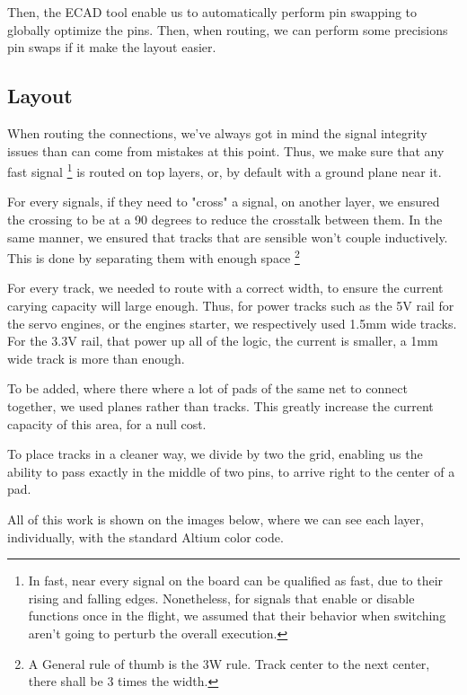 Then, the ECAD tool enable us to automatically perform pin swapping to globally optimize the pins.
Then, when routing, we can perform some precisions pin swaps if it make the layout easier.

\subsection{Layout}
When routing the connections, we've always got in mind the signal integrity issues than can come
from mistakes at this point.
Thus, we make sure that any fast signal \footnote{
    In fast, near every signal on the board can be qualified as fast, due to their rising and falling
    edges. Nonetheless, for signals that enable or disable functions once in the flight, we assumed
    that their behavior when switching aren't going to perturb the overall execution.
} is routed on top layers, or, by default with a ground plane near it.

For every signals, if they need to "cross" a signal, on another layer, we ensured the crossing to be
at a 90 degrees to reduce the crosstalk between them. In the same manner, we ensured that tracks that
are sensible won't couple inductively. This is done by separating them with enough space \footnote{A
    General rule of thumb is the 3W rule. Track center to the next center, there shall be 3 times the
    width.}

For every track, we needed to route with a correct width, to ensure the current carying capacity will
large enough. Thus, for power tracks such as the 5V rail for the servo engines, or the engines starter,
we respectively used 1.5mm wide tracks. For the 3.3V rail, that power up all of the logic, the current
is smaller, a 1mm wide track is more than enough.

To be added, where there where a lot of pads of the same net to connect together, we used planes rather
than tracks. This greatly increase the current capacity of this area, for a null cost.

To place tracks in a cleaner way, we divide by two the grid, enabling us the ability to pass exactly
in the middle of two pins, to arrive right to the center of a pad.

All of this work is shown on the images below, where we can see each layer, individually, with the
standard Altium color code.


